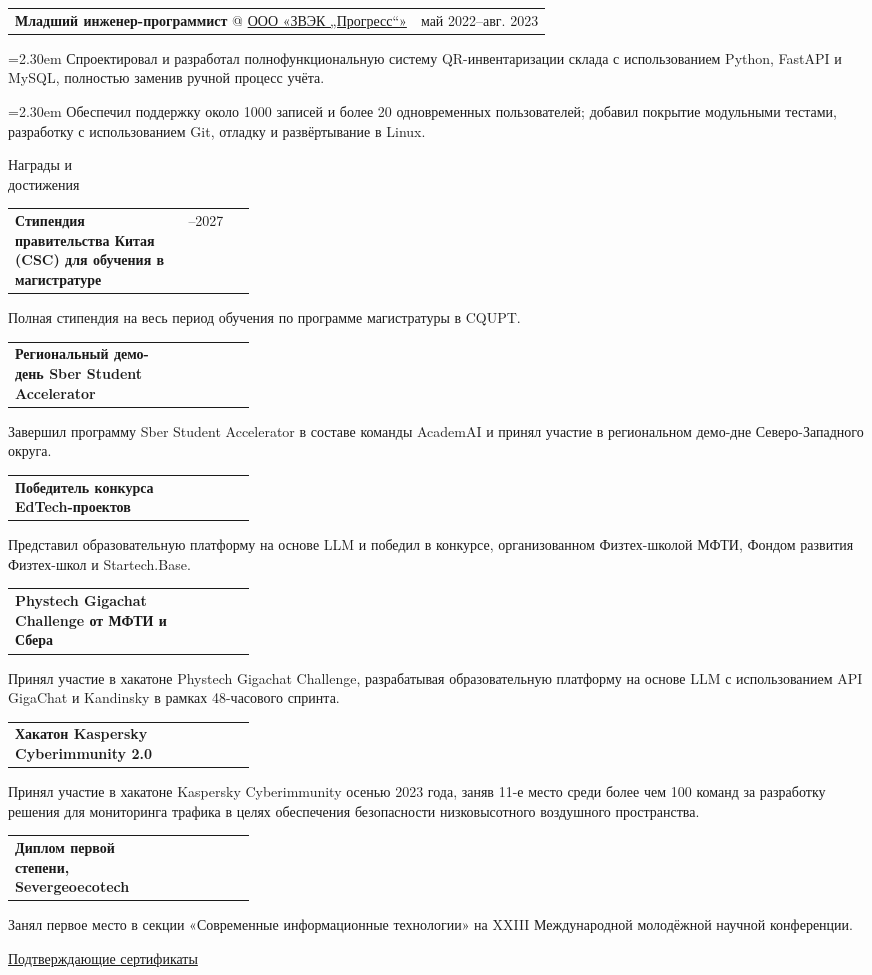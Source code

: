 \documentclass[11pt,a4paper]{article}
\makeatletter
\newcommand{\cvrow}[2]{%
  \noindent
  \begin{minipage}[t]{0.145\textwidth}
    \vspace{0pt}%
    \raggedright
    \fontsize{10.5}{12.5}\selectfont
    #1
  \end{minipage}%
  \hfill
  \begin{minipage}[t]{0.835\textwidth}
    \vspace{0pt}%
    #2
  \end{minipage}\par
}
\newcommand{\entry}[2]{%
  \begin{tabularx}{\linewidth}{@{}X >{\raggedleft\arraybackslash}p{0.28\linewidth}@{}}
    #1 & #2
  \end{tabularx}
}
\newcommand{\workentry}[2]{%
  \noindent
  \begin{tabularx}{\linewidth}
    {@{}X@{\hspace{0.8em}}r@{}}
    #1 & \small #2
  \end{tabularx}\par
  \vspace{0.15em}
}
\newcommand{\workproject}[1]{%
  \noindent
  \hangindent=2.30em
  \hangafter=1
  \hspace*{1.15em}\makebox[1.15em][l]{$\diamond$}#1\par
  \vspace{0.12em}
}
\makeatother
\begin{document}
\cvrow{}{%
  \workentry
    {\textbf{Младший инженер-программист} @
    \href{https://zvekprogress.ru/}{ООО «ЗВЭК „Прогресс“»}}
    {май 2022--авг. 2023}

  \workproject{Спроектировал и разработал полнофункциональную систему
  QR-инвентаризации склада с использованием Python, FastAPI и MySQL,
  полностью заменив ручной процесс учёта.}

  \workproject{Обеспечил поддержку около 1000 записей и более 20 одновременных
  пользователей; добавил покрытие модульными тестами, разработку с использованием
  Git, отладку и развёртывание в Linux.}
}

\vspace{0.75em}

\cvrow{Награды и\\достижения}{%
  \entry
    {\textbf{Стипендия правительства Китая (CSC) для обучения в магистратуре}}
    {2024--2027}
  Полная стипендия на весь период обучения по программе магистратуры в CQUPT.

  \vspace{0.45em}
  \entry
    {\textbf{Региональный демо-день Sber Student Accelerator}}
    {2023}
  Завершил программу Sber Student Accelerator в составе команды AcademAI
  и принял участие в региональном демо-дне Северо-Западного округа.

  \vspace{0.45em}
  \entry
    {\textbf{Победитель конкурса EdTech-проектов}}
    {2023}
  Представил образовательную платформу на основе LLM и победил в конкурсе,
  организованном Физтех-школой МФТИ, Фондом развития Физтех-школ
  и Startech.Base.

  \vspace{0.45em}
  \entry
    {\textbf{Phystech Gigachat Challenge от МФТИ и Сбера}}
    {2023}
  Принял участие в хакатоне Phystech Gigachat Challenge, разрабатывая
  образовательную платформу на основе LLM с использованием API GigaChat
  и Kandinsky в рамках 48-часового спринта.

  \vspace{0.45em}
  \entry{\textbf{Хакатон Kaspersky Cyberimmunity 2.0}}
  {2023}
  Принял участие в хакатоне Kaspersky Cyberimmunity осенью 2023 года,
  заняв 11-е место среди более чем 100 команд за разработку решения
  для мониторинга трафика в целях обеспечения безопасности
  низковысотного воздушного пространства.

  \vspace{0.45em}
  \entry
    {\textbf{Диплом первой степени, Severgeoecotech}}
    {2022}
  Занял первое место в секции «Современные информационные технологии»
  на XXIII Международной молодёжной научной конференции.

  \vspace{0.3em}
  \href{https://iasenovets.github.io/files/certificates_selected_en_public_ready_v2.pdf}
       {\small Подтверждающие сертификаты}
}
\end{document}
